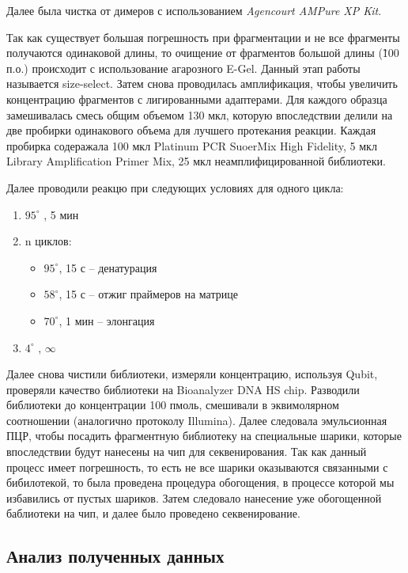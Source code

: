 Далее была чистка от димеров с использованием \textit{Agencourt AMPure XP Kit}.

Так как существует большая погрешность при фрагментации и не все фрагменты получаются одинаковой длины, то очищение от фрагментов большой длины (\~100 п.о.) происходит с использование агарозного E-Gel. Данный этап работы называется size-select. Затем снова проводилась амплификация, чтобы увеличить концентрацию фрагментов с лигированными адаптерами. Для каждого образца замешивалась смесь общим объемом 130 мкл, которую впоследствии делили на две пробирки одинакового объема для лучшего протекания реакции. Каждая пробирка содеражала 100 мкл Platinum PCR SuoerMix High Fidelity, 5 мкл Library Amplification Primer Mix, 25 мкл неамплифицированной библиотеки. 

Далее проводили реакцю при следующих условиях для одного цикла:

\begin{enumerate}
	\item $95^{\circ}$ , 5 мин 
	\item n циклов:
	\begin{itemize}
		\item $95^{\circ}$, 15 с – денатурация
		\item $58^{\circ}$, 15 с – отжиг праймеров на матрице
		\item $70^{\circ}$, 1 мин – элонгация
	\end{itemize}
	\item $4^{\circ}$ ,  $\infty$
\end{enumerate}

Далее снова чистили библиотеки, измеряли концентрацию, используя Qubit, проверяли качество библиотеки на Bioanalyzer DNA HS chip. Разводили библиотеки до концентрации 100 пмоль, смешивали в эквимолярном соотношении (аналогично протоколу Illumina). Далее следовала эмульсионная ПЦР, чтобы посадить фрагментную библиотеку на специальные шарики, которые впоследствии будут нанесены на чип для секвенирования. Так как данный процесс имеет погрешность, то есть не все шарики оказываются связанными с бибилотекой, то была проведена процедура обогощения, в процессе которой мы избавились от пустых шариков. Затем следовало нанесение уже обогощенной баблиотеки на чип, и далее было проведено секвенирование. 


\subsection{Анализ полученных данных}  \label{subsect1_2_5}

